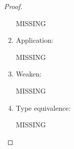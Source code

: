 \begin{theorem}
\begin{proof}
\begin{enumerate}
            MISSING

        \item Application:

            MISSING
        \item Weaken:

            MISSING
        \item Type equivalence:

            MISSING
        \end{enumerate}
    \end{proof}
\end{theorem}
